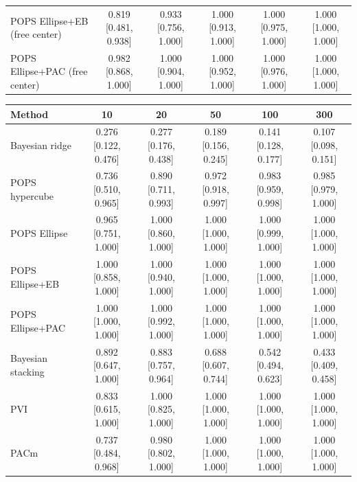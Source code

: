 \begin{tabular}{lccccc}
POPS Ellipse+EB (free center) & 0.819 {\scriptsize[0.481, 0.938]} & 0.933 {\scriptsize[0.756, 1.000]} & 1.000 {\scriptsize[0.913, 1.000]} & 1.000 {\scriptsize[0.975, 1.000]} & 1.000 {\scriptsize[1.000, 1.000]} \\
POPS Ellipse+PAC (free center) & 0.982 {\scriptsize[0.868, 1.000]} & 1.000 {\scriptsize[0.904, 1.000]} & 1.000 {\scriptsize[0.952, 1.000]} & 1.000 {\scriptsize[0.976, 1.000]} & 1.000 {\scriptsize[1.000, 1.000]} \\
\bottomrule
\end{tabular}

\begin{tabular}{lccccc}
\toprule
Method & 10 & 20 & 50 & 100 & 300 \\
\midrule
Bayesian ridge & 0.276 {\scriptsize[0.122, 0.476]} & 0.277 {\scriptsize[0.176, 0.438]} & 0.189 {\scriptsize[0.156, 0.245]} & 0.141 {\scriptsize[0.128, 0.177]} & 0.107 {\scriptsize[0.098, 0.151]} \\
POPS hypercube & 0.736 {\scriptsize[0.510, 0.965]} & 0.890 {\scriptsize[0.711, 0.993]} & 0.972 {\scriptsize[0.918, 0.997]} & 0.983 {\scriptsize[0.959, 0.998]} & 0.985 {\scriptsize[0.979, 1.000]} \\
POPS Ellipse & 0.965 {\scriptsize[0.751, 1.000]} & 1.000 {\scriptsize[0.860, 1.000]} & 1.000 {\scriptsize[1.000, 1.000]} & 1.000 {\scriptsize[0.999, 1.000]} & 1.000 {\scriptsize[1.000, 1.000]} \\
POPS Ellipse+EB & 1.000 {\scriptsize[0.858, 1.000]} & 1.000 {\scriptsize[0.940, 1.000]} & 1.000 {\scriptsize[1.000, 1.000]} & 1.000 {\scriptsize[1.000, 1.000]} & 1.000 {\scriptsize[1.000, 1.000]} \\
POPS Ellipse+PAC & 1.000 {\scriptsize[1.000, 1.000]} & 1.000 {\scriptsize[0.992, 1.000]} & 1.000 {\scriptsize[1.000, 1.000]} & 1.000 {\scriptsize[1.000, 1.000]} & 1.000 {\scriptsize[1.000, 1.000]} \\
Bayesian stacking & 0.892 {\scriptsize[0.647, 1.000]} & 0.883 {\scriptsize[0.757, 0.964]} & 0.688 {\scriptsize[0.607, 0.744]} & 0.542 {\scriptsize[0.494, 0.623]} & 0.433 {\scriptsize[0.409, 0.458]} \\
PVI & 0.833 {\scriptsize[0.615, 1.000]} & 1.000 {\scriptsize[0.825, 1.000]} & 1.000 {\scriptsize[1.000, 1.000]} & 1.000 {\scriptsize[1.000, 1.000]} & 1.000 {\scriptsize[1.000, 1.000]} \\
PACm & 0.737 {\scriptsize[0.484, 0.968]} & 0.980 {\scriptsize[0.802, 1.000]} & 1.000 {\scriptsize[1.000, 1.000]} & 1.000 {\scriptsize[1.000, 1.000]} & 1.000 {\scriptsize[1.000, 1.000]} \\

\end{tabular}
